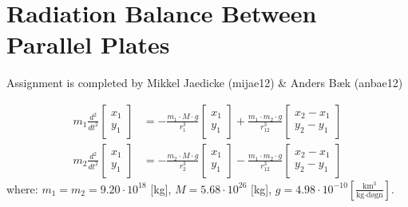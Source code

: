 \section*{Radiation Balance Between Parallel Plates}
Assignment is completed by Mikkel Jaedicke (mijae12) \& Anders Bæk (anbae12)

%


\begin{equation}
\begin{align*}
m_{ 1 }\frac { { d }^{ 2 } }{ { dt }^{ 2 } } \left[ \begin{matrix} x_{ 1 } \\ y_{ 1 } \end{matrix} \right] &=-\frac { m_{ 1 }\cdot M\cdot g }{ { r }^{ 3 }_{ 1 } } \left[ \begin{matrix} x_{ 1 } \\ y_{ 1 } \end{matrix} \right] +\frac { m_{ 1 }\cdot m_2\cdot g }{ { r }^{ 3 }_{ 12 } } \left[ \begin{matrix} x_{ 2 }-x_{ 1 } \\ y_{ 2 }-y_{ 1 } \end{matrix} \right] \\
m_{ 2 }\frac { { d }^{ 2 } }{ { dt }^{ 2 } } \left[ \begin{matrix} x_{ 1 } \\ y_{ 1 } \end{matrix} \right] &=-\frac { m_{ 2 }\cdot M\cdot g }{ { r }^{ 3 }_{ 2 } } \left[ \begin{matrix} x_{ 1 } \\ y_{ 1 } \end{matrix} \right] -\frac { m_{ 1 }\cdot m_{ 2 }\cdot g }{ { r }^{ 3 }_{ 12 } } \left[ \begin{matrix} x_{ 2 }-x_{ 1 } \\ y_{ 2 }-y_{ 1 } \end{matrix} \right] 
\end{align*}
\label{eq:1}
\end{equation}
where: \( m_1 = m_2 =9.20 \cdot 10^{18} \) [kg], \( M = 5.68  \cdot 10^{26} \) [kg], \( g = 4.98 \cdot 10^{-10} \left[ \frac { \text{km}^3 }{ \text{kg} \cdot \text{døgn} }  \right] \).

